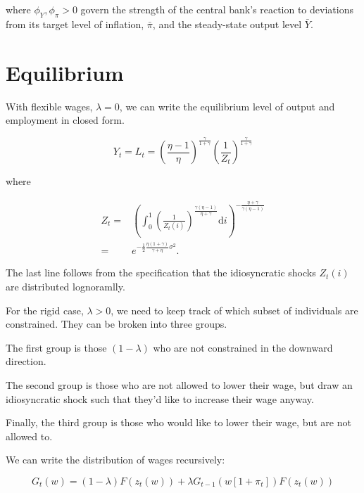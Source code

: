 \documentclass[12pt,a4paper]{scrartcl}            %
\begin{document}
where $\phi_Y, \phi_{\pi} > 0$ govern the strength of the central bank's reaction to deviations from its target level of inflation, $\bar{\pi}$, and the steady-state output level $\bar{Y}$.

\section{Equilibrium}
\label{sec:equilibrium}

With flexible wages, $\lambda = 0$, we can write the equilibrium level of output and employment in closed form.

\begin{equation}
    \label{eq:output_flexible}
    Y_t = L_t = \left( \frac{\eta - 1}{\eta} \right)^{\frac{\gamma}{1 + \gamma}} \left( \frac{1}{Z_t} \right)^{\frac{\gamma}{1 + \gamma}}
\end{equation}

where

\begin{align}
    Z_t =& \left( \int_{0}^{1}\! \left( \frac{1}{Z_t(i)} \right)^{\frac{\gamma(\eta - 1)}{\eta + \gamma}} \mathrm{d}i \right)^{-\frac{\eta + \gamma}{\gamma(\eta - 1)}}\\
        =& e^{-\frac{1}{2} \frac{\eta(1 + \gamma)}{\gamma + \eta}\sigma^2 }.
\end{align}

The last line follows from the specification that the idiosyncratic shocks $Z_t(i)$ are distributed lognoramlly.

For the rigid case, $\lambda > 0$, we need to keep track of which subset of individuals are constrained.
They can be broken into three groups.

The first group is those $(1 - \lambda)$ who are not constrained in the downward direction.

The second group is those who are not allowed to lower their wage, but draw an idiosyncratic shock such that they'd like to increase their wage anyway.

Finally, the third group is those who would like to lower their wage, but are not allowed to.

We can write the distribution of wages recursively:

\begin{equation}
    \label{eq:wage_distribution}
    G_t(w) = (1 - \lambda) F(z_t(w)) + \lambda G_{t-1}\left(w[1 + \pi_t]\right)F(z_t(w))
\end{equation}
\end{document}
